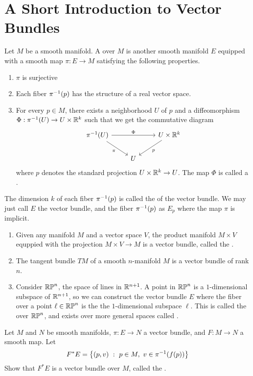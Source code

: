 \section{A Short Introduction to Vector Bundles}
%
\begin{defn}
Let $M$ be a smooth manifold. A  over $M$ is
another smooth manifold $E$ equipped with a smooth map $\pi : E \to M$
satisfying the following properties.
\begin{enumerate}
	\item $\pi$ is surjective
	\item Each fiber $\pi^{-1}(p)$ has the structure of a real vector space.
	\item For every $p \in M$, there exists a neighborhood $U$ of $p$ and
	a diffeomorphism $\Phi : \pi^{-1}(U) \to U \times \mathbb{R}^k$ such that we get
	the commutative diagram
	$$\begin{tikzcd}
	\pi\inv(U) \ar[dr, "\pi"'] \ar[rr, "\Phi"] &&
	U \times \R^k \ar[dl, "p"] \\
	& U
	\end{tikzcd}$$
	where $p$ denotes the standard projection $U \times \mathbb{R}^k \to U$. The
	map $\Phi$ is called a .
\end{enumerate}
The dimension $k$ of each fiber $\pi^{-1}(p)$ is called the  of
the vector bundle. We may just call $E$ the vector bundle, and the fiber
$\pi^{-1}(p)$ as $E_p$ where the map $\pi$ is implicit.
\end{defn}
%
\begin{exmp} \enumbreak
	\begin{enumerate}
		\item Given any manifold $M$ and a vector space $V$, the product
		manifold $M \times V$ equppied with the projection $M \times V \to M$
		is a vector bundle, called the .
		\item The tangent bundle $TM$ of a smooth $n$-manifold $M$ is a
		vector bundle of rank $n$.
		\item Consider $\mathbb{RP}^n$, the space of lines in $\mathbb{R}^{n+1}$. A point
		in $\mathbb{RP}^n$ is a $1$-dimensional subspace of $\mathbb{R}^{n+1}$, so we can
		construct the vector bundle $E$ where the fiber over a point
		$\ell \in \mathbb{RP}^n$ is the the $1$-dimensional subspace $\ell$.
		This is called the  over $\mathbb{RP}^n$, and
		exists over more general spaces called .
	\end{enumerate}
\end{exmp}
%
\begin{exer}
	Let $M$ and $N$ be smooth manifolds, $\pi : E \to N$ a vector bundle,
	and $F : M \to N$ a smooth map. Let
	$$F^*E = \left\lbrace (p, v) ~:~ p \in M, ~v \in \pi^{-1}(f(p)) \right\rbrace $$
	Show that $F^*E$ is a vector bundle over $M$, called the
	.
\end{exer}
